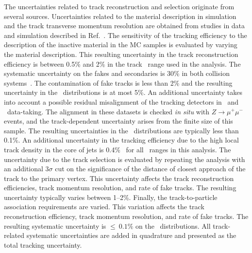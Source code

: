 The uncertainties related to track reconstruction and selection originate from several sources.
Uncertainties related to the material description in simulation and the track transverse momentum resolution are obtained from studies in data and simulation described in Ref.~\cite{ATL-PHYS-PUB-2015-051}.
The sensitivity of the tracking efficiency to the description of the inactive material in the MC samples is evaluated by varying the material description.
This resulting uncertainty in the track reconstruction efficiency is between 0.5\% and 2\% in the track \pT\ range used in the analysis.
The systematic uncertainty on the fakes and secondaries is 30\% in both collision systems~\cite{ATL-PHYS-PUB-2015-051}.
The contamination of fake tracks is less than 2\% and the resulting uncertainty in the \Dptr\ distributions is at most 5\%.
An additional uncertainty takes into account a possible residual misalignment of the tracking detectors in \pp\ and \PbPb\ data-taking.
The alignment in these datasets is checked \textit{in situ} with $Z\rightarrow \mu^{+}\mu^{-}$ events, and the track-\pT\-dependent uncertainty arises from the finite size of this sample.
The resulting uncertainties in the \Dptr\ distributions are typically less than 0.1\%.
An additional uncertainty in the tracking efficiency due to the high local track density in the core of jets is 0.4\%~\cite{ATL-PHYS-PUB-2016-007} for all \ptjet\ ranges in this analysis.
The uncertainty due to the track selection is evaluated by repeating the analysis with an additional $3\sigma$ cut on the significance of the distance of closest approach of the track to the primary vertex.
This uncertainty affects the track reconstruction efficiencies, track momentum resolution, and rate of fake tracks.
The resulting uncertainty typically varies between 1--2\%.
Finally, the track-to-particle association requirements are varied.
This variation affects the track reconstruction efficiency, track momentum resolution, and rate of fake tracks.
The resulting systematic uncertainty is $\leq~0.1 \%$ on the \Dptr\ distributions.
All track-related systematic uncertainties are added in quadrature and presented as the total tracking uncertainty.



